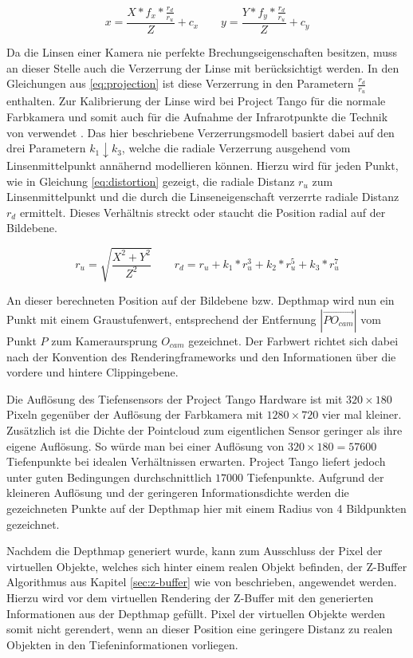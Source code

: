 \begin{equation}\label{eq:projection}
x = \frac{X* f_x * \frac{r_d}{r_u}}{Z}  + c_x
\qquad
y = \frac{Y* f_y * \frac{r_d}{r_u}}{Z}  + c_y
\end{equation}

Da die Linsen einer Kamera nie perfekte Brechungseigenschaften besitzen, muss an dieser Stelle auch die Verzerrung der Linse mit berücksichtigt werden. In den Gleichungen aus \ref{eq:projection} ist diese Verzerrung in den Parametern \(\frac{r_d}{r_u}\) enthalten. Zur Kalibrierung der Linse wird bei Project Tango für die normale Farbkamera und somit auch für die Aufnahme der Infrarotpunkte die Technik von \citet{tsai1987versatile} verwendet  \citep{Tango90:online}. Das hier beschriebene Verzerrungsmodell basiert dabei auf den drei Parametern \(k_{1} \downarrow  k_{3}\), welche die radiale Verzerrung ausgehend vom Linsenmittelpunkt annähernd modellieren können. Hierzu wird für jeden Punkt, wie in Gleichung \ref{eq:distortion} gezeigt, die radiale Distanz \(r_u\) zum Linsenmittelpunkt und die durch die Linseneigenschaft verzerrte radiale Distanz \(r_d\) ermittelt. Dieses Verhältnis streckt oder staucht die Position radial auf der Bildebene.


\begin{equation} \label{eq:distortion}
r_u = \sqrt{\frac{X^2 + Y^2}{ Z^2}} 
\qquad
r_d = r_u + k_1 * r_u^3 + k_2 * r_u^5 + k_3 * r_u^7
\end{equation}

An dieser berechneten Position auf der Bildebene bzw. Depthmap wird nun ein Punkt mit einem Graustufenwert, entsprechend der Entfernung \(|\overrightarrow{PO_{cam}}|\) vom Punkt \(P\) zum Kameraursprung \(O_{cam}\) gezeichnet. Der Farbwert richtet sich dabei nach der Konvention des Renderingframeworks und den Informationen über die vordere und hintere Clippingebene.

Die Auflösung des Tiefensensors der Project Tango Hardware ist mit \(320 \times 180\) Pixeln gegenüber der Auflösung der Farbkamera mit \(1280 \times 720\) vier mal kleiner. Zusätzlich ist die Dichte der Pointcloud zum eigentlichen Sensor geringer als ihre eigene Auflösung. So würde man bei einer Auflösung von \(320 \times 180 = 57600\) Tiefenpunkte bei idealen Verhältnissen erwarten. Project Tango liefert jedoch unter guten Bedingungen durchschnittlich \(17000\) Tiefenpunkte. Aufgrund der kleineren Auflösung und der geringeren Informationsdichte werden die gezeichneten Punkte auf der Depthmap hier mit einem Radius von 4 Bildpunkten gezeichnet. 

Nachdem die Depthmap generiert wurde, kann zum Ausschluss der Pixel der virtuellen Objekte, welches sich hinter einem realen Objekt befinden, der Z-Buffer Algorithmus aus Kapitel \ref{sec:z-buffer} wie von \citet{wloka1995resolving} beschrieben, angewendet werden. Hierzu wird vor dem virtuellen Rendering der Z-Buffer mit den generierten Informationen aus der Depthmap gefüllt. Pixel der virtuellen Objekte werden somit nicht gerendert, wenn an dieser Position eine geringere Distanz zu realen Objekten in den Tiefeninformationen vorliegen. 


